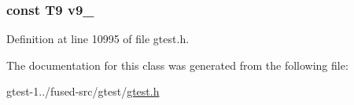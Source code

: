 \hypertarget{classtesting_1_1internal_1_1ValueArray14_a6356e16cf54a9dfac8525f20242af31e}{
\subsubsection[{v9\-\_\-}]{\setlength{\rightskip}{0pt plus 5cm}const \-T9 {\bf v9\-\_\-}}}\label{d8/d9a/classtesting_1_1internal_1_1ValueArray14_a6356e16cf54a9dfac8525f20242af31e}


\-Definition at line 10995 of file gtest.\-h.



\-The documentation for this class was generated from the following file\-:\begin{DoxyCompactItemize}
\item 
gtest-\/1../fused-\/src/gtest/\hyperlink{fused-src_2gtest_2gtest_8h}{gtest.\-h}\end{DoxyCompactItemize}

